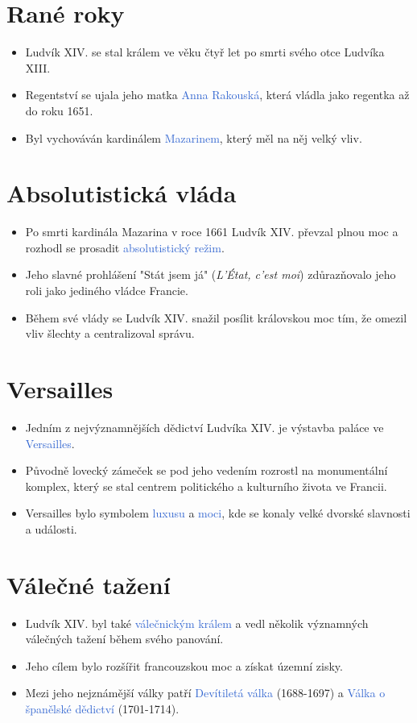 \documentclass{article}
\begin{document}
\section{Rané roky}
\begin{itemize}[label=$\bullet$,itemsep=2pt]
  \item Ludvík XIV. se stal králem ve věku čtyř let po smrti svého otce Ludvíka XIII.
  \item Regentství se ujala jeho matka \textcolor{highlight}{Anna Rakouská}, která vládla jako regentka až do roku 1651.
  \item Byl vychováván kardinálem \textcolor{highlight}{Mazarinem}, který měl na něj velký vliv.
\end{itemize}

\section{Absolutistická vláda}
\begin{itemize}[label=$\bullet$,itemsep=2pt]
  \item Po smrti kardinála Mazarina v roce 1661 Ludvík XIV. převzal plnou moc a rozhodl se prosadit \textcolor{highlight}{absolutistický režim}.
  \item Jeho slavné prohlášení "Stát jsem já" (\textit{L'État, c'est moi}) zdůrazňovalo jeho roli jako jediného vládce Francie.
  \item Během své vlády se Ludvík XIV. snažil posílit královskou moc tím, že omezil vliv šlechty a centralizoval správu.
\end{itemize}

\section{Versailles}
\begin{itemize}[label=$\bullet$,itemsep=2pt]
\item Jedním z nejvýznamnějších dědictví Ludvíka XIV. je výstavba paláce ve \textcolor{highlight}{Versailles}.
\item Původně lovecký zámeček se pod jeho vedením rozrostl na monumentální komplex, který se stal centrem politického a kulturního života ve Francii.
\item Versailles bylo symbolem \textcolor{highlight}{luxusu} a \textcolor{highlight}{moci}, kde se konaly velké dvorské slavnosti a události.
\end{itemize}

\section{Válečné tažení}
\begin{itemize}[label=$\bullet$,itemsep=2pt]
\item Ludvík XIV. byl také \textcolor{highlight}{válečnickým králem} a vedl několik významných válečných tažení během svého panování.
\item Jeho cílem bylo rozšířit francouzskou moc a získat územní zisky.
\item Mezi jeho nejznámější války patří \textcolor{highlight}{Devítiletá válka} (1688-1697) a \textcolor{highlight}{Válka o španělské dědictví} (1701-1714).
\end{itemize}
\end{document}
